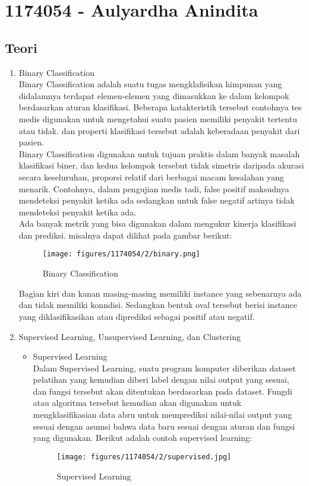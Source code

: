 \section{1174054 - Aulyardha Anindita}

\subsection{Teori}
\begin{enumerate}
\item Binary Classification \\
Binary Classification adalah suatu tugas mengklafisikan himpunan yang didalamnya terdapat elemen-elemen yang dimasukkan ke dalam kelompok berdasarkan aturan klasifikasi. Beberapa katakteristik tersebut contohnya tes medis digunakan untuk mengetahui suatu pasien memiliki penyakit tertentu atau tidak. dan properti klasifikasi tersebut adalah keberadaan penyakit dari pasien.\\

Binary Classification digunakan untuk tujuan praktis dalam banyak masalah klasifikasi biner, dan kedua kelompok tersebut tidak simetris daripada akurasi secara keseluruhan, proporsi relatif dari berbagai macam kesalahan yang menarik. Contohnya, dalam pengujian medis tadi, false positif maksudnya mendeteksi penyakit ketika ada sedangkan untuk false negatif artinya tidak mendeteksi penyakit ketika ada.\\

Ada banyak metrik yang bisa digunakan dalam mengukur kinerja klasifikasi dan prediksi. misalnya dapat dilihat pada gambar berikut:
\begin{figure}[H]
		\texttt{[image: figures/1174054/2/binary.png]}
		\centering
		\caption{Binary Classification}
\end{figure}

Bagian kiri dan kanan masing-masing memiliki instance yang sebenarnya ada dan tidak memiliki konndisi. Sedangkan bentuk oval tersebut berisi instance yang diklasifikasikan atau diprediksi sebagai positif atau negatif.

\item Supervised Learning, Unsupervised Learning, dan Clustering
\begin{itemize}
\item Supervised Learning \\
Dalam Supervised Learning, suatu program komputer diberikan dataset pelatihan yang kemudian diberi label dengan nilai output yang sesuai, dan fungsi tersebut akan ditentukan berdasarkan pada dataset. Fungdi atau algoritma tersebut kemudian akan digunakan untuk mengklasifikasian data abru untuk memprediksi nilai-nilai output yang sesuai dengan asumsi bahwa data baru sesuai dengan aturan dan fungsi yang digunakan. Berikut adalah contoh supervised learning:
\begin{figure}[H]
		\texttt{[image: figures/1174054/2/supervised.jpg]}
		\centering
		\caption{Supervised Learning}
\end{figure}


\end{itemize}
\end{enumerate}

